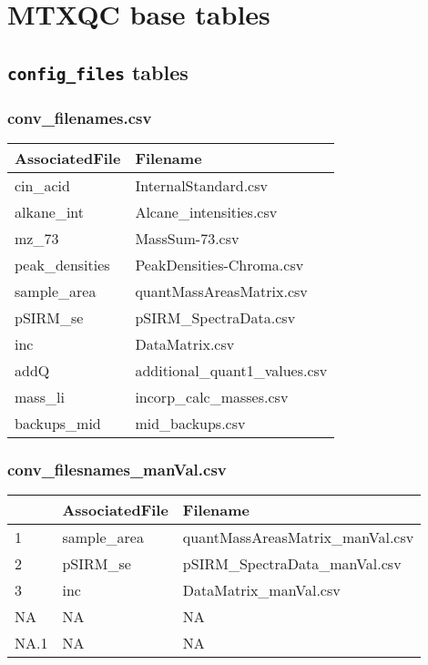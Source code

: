 \documentclass[]{book}
\begin{document}
\hypertarget{mtxqc-base-tables}{%
\section{MTXQC base tables}\label{mtxqc-base-tables}}

\hypertarget{config_files-tables}{%
\subsection{\texorpdfstring{\texttt{config\_files} tables}{config\_files tables}}\label{config_files-tables}}

\hypertarget{filenames}{%
\subsubsection{conv\_filenames.csv}\label{filenames}}

\begin{tabu} to 
\toprule
AssociatedFile & Filename\\
\midrule
{}  cin\_acid & InternalStandard.csv\\
alkane\_int & Alcane\_intensities.csv\\
  mz\_73 & MassSum-73.csv\\
peak\_densities & PeakDensities-Chroma.csv\\
  sample\_area & quantMassAreasMatrix.csv\\
\addlinespace
pSIRM\_se & pSIRM\_SpectraData.csv\\
  inc & DataMatrix.csv\\
addQ & additional\_quant1\_values.csv\\
  mass\_li & incorp\_calc\_masses.csv\\
backups\_mid & mid\_backups.csv\\
\bottomrule
\end{tabu}

\hypertarget{filenamesManVal}{%
\subsubsection{conv\_filesnames\_manVal.csv}\label{filenamesManVal}}

\begin{tabu} to 
\toprule
  & AssociatedFile & Filename\\
\midrule
{}  1 & sample\_area & quantMassAreasMatrix\_manVal.csv\\
2 & pSIRM\_se & pSIRM\_SpectraData\_manVal.csv\\
  3 & inc & DataMatrix\_manVal.csv\\
NA & NA & NA\\
  NA.1 & NA & NA\\
\bottomrule
\end{tabu}
\end{document}
